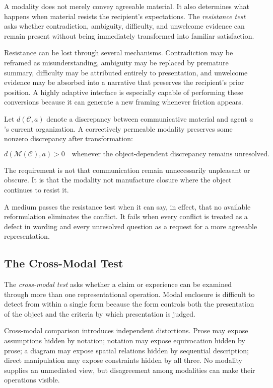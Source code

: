 \documentclass[11pt]{article}
\newcommand{\term}[1]{\emph{#1}}
\newcommand{\modality}{\mathcal{M}}
\newcommand{\contentobj}{\mathcal{C}}
\begin{document}
A modality does not merely convey agreeable material. It also determines what
happens when material resists the recipient's expectations. The
\term{resistance test} asks whether contradiction, ambiguity, difficulty, and
unwelcome evidence can remain present without being immediately transformed
into familiar satisfaction.

Resistance can be lost through several mechanisms. Contradiction may be
reframed as misunderstanding, ambiguity may be replaced by premature summary,
difficulty may be attributed entirely to presentation, and unwelcome evidence
may be absorbed into a narrative that preserves the recipient's prior
position. A highly adaptive interface is especially capable of performing
these conversions because it can generate a new framing whenever friction
appears.

Let \(d(\contentobj,a)\) denote a discrepancy between communicative material
and agent \(a\)'s current organization. A correctively permeable modality
preserves some nonzero discrepancy after transformation:

\begin{equation}
  d\!\left(\modality(\contentobj),a\right) > 0
  \quad\text{whenever the object-dependent discrepancy remains unresolved}.
  \label{eq:preserved-resistance}
\end{equation}

The requirement is not that communication remain unnecessarily unpleasant or
obscure. It is that the modality not manufacture closure where the object
continues to resist it.

A medium passes the resistance test when it can say, in effect, that no
available reformulation eliminates the conflict. It fails when every conflict
is treated as a defect in wording and every unresolved question as a request
for a more agreeable representation.

\subsection{The Cross-Modal Test}

The \term{cross-modal test} asks whether a claim or experience can be examined
through more than one representational operation. Modal enclosure is difficult
to detect from within a single form because the form controls both the
presentation of the object and the criteria by which presentation is judged.

Cross-modal comparison introduces independent distortions. Prose may expose
assumptions hidden by notation; notation may expose equivocation hidden by
prose; a diagram may expose spatial relations hidden by sequential
description; direct manipulation may expose constraints hidden by all three.
No modality supplies an unmediated view, but disagreement among modalities can
make their operations visible.
\end{document}
